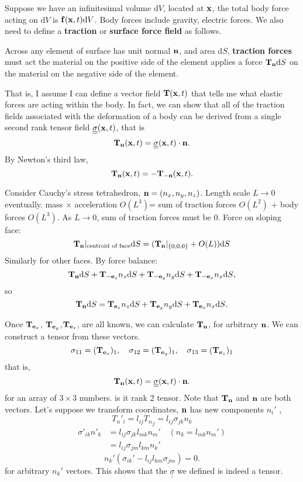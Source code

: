 \documentclass[12pt]{article}
\newcommand{\xx}{{\bf x}}
\newcommand{\ee}{{\bf e}}
\newcommand{\ff}{{\bf f}}
\newcommand{\nn}{{\bf n}}
\newcommand{\bT}{{\bf T}}
\newcommand{\ssigma}{{\underline{\underline \sigma}}}
\newcommand{\dV}{{\text{d}V}}
\newcommand{\dS}{{\text{d}S}}
\begin{document}
Suppose we have an infinitesimal volume $\dV$, located at $\xx$, the total body force acting on $\dV$ is $\ff(\xx,t)\dV$. Body forces include gravity, electric forces. We also need to define a {\bf traction} or {\bf surface force field} as follows. 

Across any element of surface has unit normal $\nn$, and area $\dS$,  {\bf traction forces} must act the material on the positive side of the element applies a force $\bT_{\nn}\dS$ on the material on the negative side of the element.

That is, I assume I can define a vector field $\bT(\xx, t)$ that tells me what elastic forces are acting within the body. In fact, we can show that all of the traction fields associated with the deformation of a body can be derived from a single second rank tensor field $\ssigma(\xx,t)$, that is
\[
\bT_{\nn}(\xx,t) = \ssigma(\xx,t)\cdot \nn .
\]
By Newton's third law,
\[
\bT_{\nn}(\xx,t) = -\bT_{-\nn}(\xx,t).
\]

Consider Cauchy's stress tetrahedron, $\nn = (n_x, n_y, n_z)$. Length scale $L\to 0$ eventually.
mass $\times$ acceleration $O(L^3)$= sum of traction forces $O(L^2)$ $+$ body forces $O(L^3)$. As $L\to 0$, sum of traction forces must be 0.  Force on sloping face:
\[
\bT_{\nn}\rvert_ {\text {centroid of face}}\dS = (\bT_{\nn}\rvert_{\{0,0,0\}}+ O(L))\dS 
\]
Similarly for other faces. By force balance:
\[
\bT_{\nn}\dS + \bT_{-\ee_z}n_z\dS +\bT_{-\ee_y}n_y\dS +\bT_{-\ee_x}n_x\dS,
\]
so 
\[
\bT_{\nn}\dS = \bT_{\ee_z}n_z\dS +\bT_{\ee_y}n_y\dS +\bT_{\ee_x}n_x\dS .
\]

Once $\bT_{\ee_x}$, $\bT_{\ee_y}$,$\bT_{\ee_z}$, are all known, we can calculate $\bT_{\nn}$, for arbitrary $\nn$. We can construct a tensor from these vectors.
\[
\sigma_{11} = (\bT_{\ee_x})_1, \quad \sigma_{12} = (\bT_{\ee_y})_1,\quad \sigma_{13} = (\bT_{\ee_z})_1
\]
that is, 
\[
\bT_{\nn}(\xx,t) = \ssigma(\xx,t)\cdot \nn .
\]
for an array of $3\times 3$ numbers. is it  rank 2 tensor.
Note that $\bT_{\nn}$ and $\nn$ are both vectors. Let's suppose we transform coordinates, $\nn$ has new components $n_i'$ ,
\[
{T_{n}}'_i = l_{ij} {T_{n}}_j = l_{ij} \sigma_{jk}n_k
\]
\begin{align*}
\sigma'_{ik}n'_k &=  l_{ij} \sigma_{jk} l_{mk}n_m' \quad (n_k = l_{mk}n_m')\\
&=   l_{ij} \sigma_{jm} l_{km}n_k' 
\end{align*}
\[
n_k'(\sigma_{ik}' - l_{ij}l_{km}\sigma_{jm})=0.
\]
for arbitrary $n_k'$ vectors. This shows that the $\ssigma$ we defined is indeed a tensor.
\end{document}
